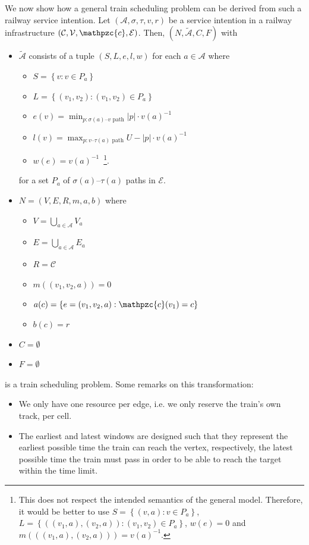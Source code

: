 \documentclass{article}
\begin{document}
We now show how a general train scheduling problem can be derived from such a railway service intention. Let $(\mathcal{A},\sigma,\tau,v,r)$ be a service intention in a railway infrastructure $(\mathcal{C}, \mathcal{V}, \mathpzc{c}, \mathcal{E})$.
Then, $(N,\tilde{\mathcal{A}},C,F)$ with
\begin{itemize}
    \item $\tilde{\mathcal{A}}$ consists of a tuple $(S,L,e,l,w)$ for each $a \in \mathcal{A}$ where
        \begin{itemize}
            \item $S=\left\{ v: v \in P_a\right\}$
            \item $L=\left\{ (v_1,v_2): (v_1,v_2) \in P_a\right\}$
            \item $e(v)=\min_{p: \sigma(a)\textrm{--}v\textrm{ path}} \left|p\right| \cdot {v(a)}^{-1}$
            \item $l(v)=\max_{p: v\textrm{--}\tau(a)\textrm{ path}} U-\left|p\right| \cdot {v(a)}^{-1}$
            \item $w(e)={v(a)}^{-1}$\mbox{  }\footnote{This does not respect the intended semantics of the general model. Therefore, it would be better to use $S=\left\{ (v,a): v \in P_a\right\}$, $L=\left\{ ((v_1,a),(v_2,a)): (v_1,v_2) \in P_a\right\}$, $w(e)=0$ and $m(((v_1,a),(v_2,a)))={v(a)}^{-1}$.}.
        \end{itemize}
        for a set $P_a$ of $\sigma(a)$--$\tau(a)$ paths in $\mathcal{E}$.
        \item $N=(V,E,R,m,a,b)$ where
        \begin{itemize}
            \item $V=\bigcup_{a \in \mathcal{A}} V_a$
            \item $E=\bigcup_{a \in \mathcal{A}} E_a$
            \item $R=\mathcal{C}$
            \item $m((v_1,v_2,a))=0$
            \item $a(c) = \left\{ e=(v_1,v_2,a): \mathpzc{c}(v_1)=c \right\}$
            \item $b(c)=r$
        \end{itemize}
    \item $C=\emptyset$
    \item $F=\emptyset$
\end{itemize}
is a train scheduling problem. Some remarks on this transformation:
\begin{itemize}
    \item We only have one resource per edge, i.e. we only reserve the train's own track, per cell.
    \item The earliest and latest windows are designed such that they represent the earliest possible time the train can reach the vertex, respectively, the latest possible time the train must pass in order to be able to reach the target within the time limit.
\end{itemize}
\end{document}

